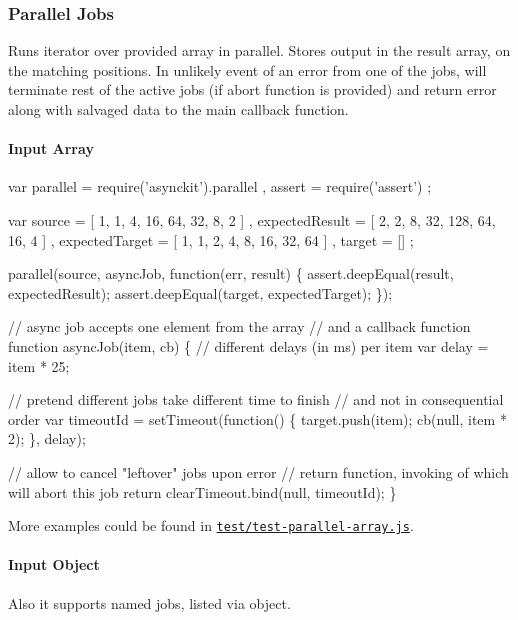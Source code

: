 \subsubsection*{Parallel Jobs}

Runs iterator over provided array in parallel. Stores output in the {\ttfamily result} array, on the matching positions. In unlikely event of an error from one of the jobs, will terminate rest of the active jobs (if abort function is provided) and return error along with salvaged data to the main callback function.

\paragraph*{Input Array}


\begin{DoxyCode}
var parallel = require('asynckit').parallel
  , assert   = require('assert')
  ;

var source         = [ 1, 1, 4, 16, 64, 32, 8, 2 ]
  , expectedResult = [ 2, 2, 8, 32, 128, 64, 16, 4 ]
  , expectedTarget = [ 1, 1, 2, 4, 8, 16, 32, 64 ]
  , target         = []
  ;

parallel(source, asyncJob, function(err, result)
\{
  assert.deepEqual(result, expectedResult);
  assert.deepEqual(target, expectedTarget);
\});

// async job accepts one element from the array
// and a callback function
function asyncJob(item, cb)
\{
  // different delays (in ms) per item
  var delay = item * 25;

  // pretend different jobs take different time to finish
  // and not in consequential order
  var timeoutId = setTimeout(function() \{
    target.push(item);
    cb(null, item * 2);
  \}, delay);

  // allow to cancel "leftover" jobs upon error
  // return function, invoking of which will abort this job
  return clearTimeout.bind(null, timeoutId);
\}
\end{DoxyCode}


More examples could be found in \href{test/test-parallel-array.js}{\tt test/test-\/parallel-\/array.\+js}.

\paragraph*{Input Object}

Also it supports named jobs, listed via object.


